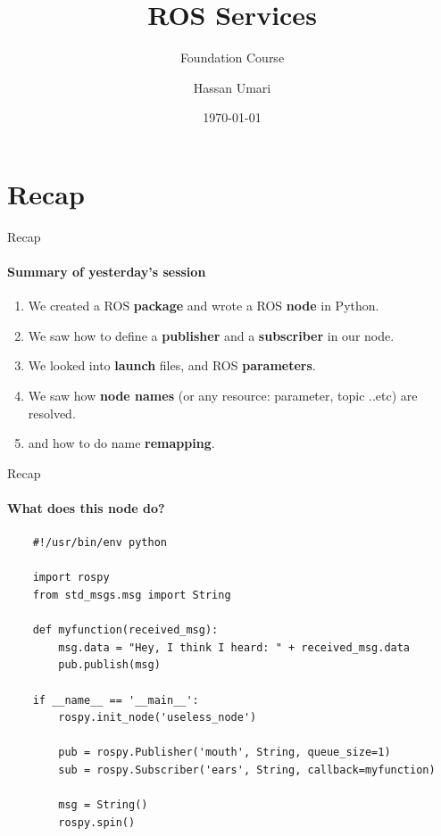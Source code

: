 \documentclass{beamer}
\author[MAS]{Hassan Umari}
\title{ROS Services}
\subtitle{Foundation Course}
\institute[HBRS]{Hochschule Bonn-Rhein-Sieg}
\date{\today}
\begin{document}
{
\begin{frame}
\titlepage
\end{frame}
}


\section{Recap}
\begin{frame}{Recap}
    \framesubtitle{Summary of yesterday’s session}
    
    \begin{enumerate}
        
        \item We created a ROS \textbf{package} and wrote a ROS \textbf{node} in Python.
        \item We saw how to define a \textbf{publisher} and a \textbf{subscriber} in our node.
        \item We looked into \textbf{launch} files, and ROS \textbf{parameters}.
        \item We saw how \textbf{node names} (or any resource: parameter, topic ..etc) are resolved.
        \item and how to do name \textbf{remapping}.


    \end{enumerate}
\end{frame}

\begin{frame}[fragile]{Recap}
    \framesubtitle{What does this node do?}
    \begin{lstlisting}
    #!/usr/bin/env python
    
    import rospy
    from std_msgs.msg import String
    
    def myfunction(received_msg):
        msg.data = "Hey, I think I heard: " + received_msg.data
        pub.publish(msg)
    
    if __name__ == '__main__':
        rospy.init_node('useless_node')
        
        pub = rospy.Publisher('mouth', String, queue_size=1)
        sub = rospy.Subscriber('ears', String, callback=myfunction)
        
        msg = String()
        rospy.spin()
    \end{lstlisting}
\end{frame}
\end{document}
